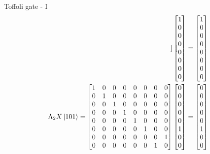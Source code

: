 \documentclass{beamer}
\begin{document}
\begin{frame}{Toffoli gate - I}
{\begin{align*}
\begin{bmatrix}
      \end{bmatrix}
      \begin{bmatrix} 
        1 \\ 0 \\ 0 \\ 0 \\ 0 \\ 0 \\ 0 \\ 0
      \end{bmatrix} 
      =
      \begin{bmatrix} 
        1 \\ 0 \\ 0 \\ 0 \\ 0 \\ 0 \\ 0 \\ 0
      \end{bmatrix} 
      \\
      \Lambda_2 X \ket{101}
      =
      \begin{bmatrix}
        1 & 0 & 0 & 0 & 0 & 0 & 0 & 0 \\
        0 & 1 & 0 & 0 & 0 & 0 & 0 & 0 \\
        0 & 0 & 1 & 0 & 0 & 0 & 0 & 0 \\
        0 & 0 & 0 & 1 & 0 & 0 & 0 & 0 \\
        0 & 0 & 0 & 0 & 1 & 0 & 0 & 0 \\
        0 & 0 & 0 & 0 & 0 & 1 & 0 & 0 \\
        0 & 0 & 0 & 0 & 0 & 0 & 0 & 1 \\
        0 & 0 & 0 & 0 & 0 & 0 & 1 & 0 \\
      \end{bmatrix}
      \begin{bmatrix} 
        0 \\ 0 \\ 0 \\ 0 \\ 0 \\ 1 \\ 0 \\ 0
      \end{bmatrix} 
      =
      \begin{bmatrix} 
        0 \\ 0 \\ 0 \\ 0 \\ 0 \\ 1 \\ 0 \\ 0
      \end{bmatrix} 
    \end{align*}
  }%
\end{frame}
\end{document}
